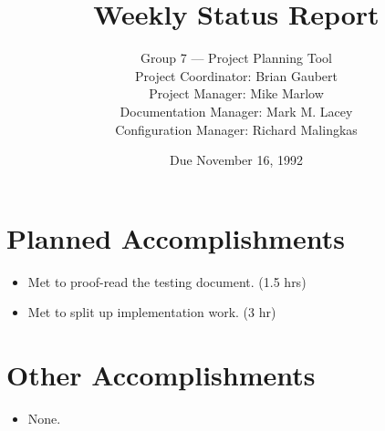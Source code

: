 


\title{Weekly Status Report}

\author{Group 7 --- Project Planning Tool\\
Project Coordinator: Brian Gaubert\\
Project Manager: Mike Marlow\\
Documentation Manager: Mark M. Lacey\\
Configuration Manager: Richard Malingkas}

\date{Due November 16, 1992}

\maketitle

%
%
%
\section{Planned Accomplishments}
\begin{itemize}
	\item Met to proof-read the testing document. (1.5 hrs)
	\item Met to split up implementation work. (3 hr)
\end{itemize}

%
%
%
\section{Other Accomplishments}
\begin{itemize}
	\item None.
\end{itemize}

%
%
%
